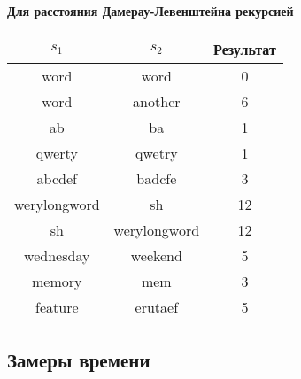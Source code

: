 ﻿\documentclass[a4paper,12pt]{article}
\begin{document}
    \hfill

    \hfill

    \textbf{Для расстояния Дамерау-Левенштейна рекурсией}

    \begin{tabular}{|c|c|c|}
        \hline
        $s_1$ & $s_2$ & Результат \\
        \hline
        word & word & 0 \\
        \hline
        word & another & 6 \\
        \hline
        ab & ba & 1 \\
        \hline
        qwerty & qwetry & 1 \\
        \hline
        abcdef & badcfe & 3 \\
        \hline
        werylongword & sh & 12 \\
        \hline
        sh & werylongword & 12 \\
        \hline
        wednesday & weekend & 5 \\
        \hline
        memory & mem & 3 \\
        \hline
        feature & erutaef & 5 \\
        \hline
    \end{tabular}



    \subsection{Замеры времени}
\end{document}
